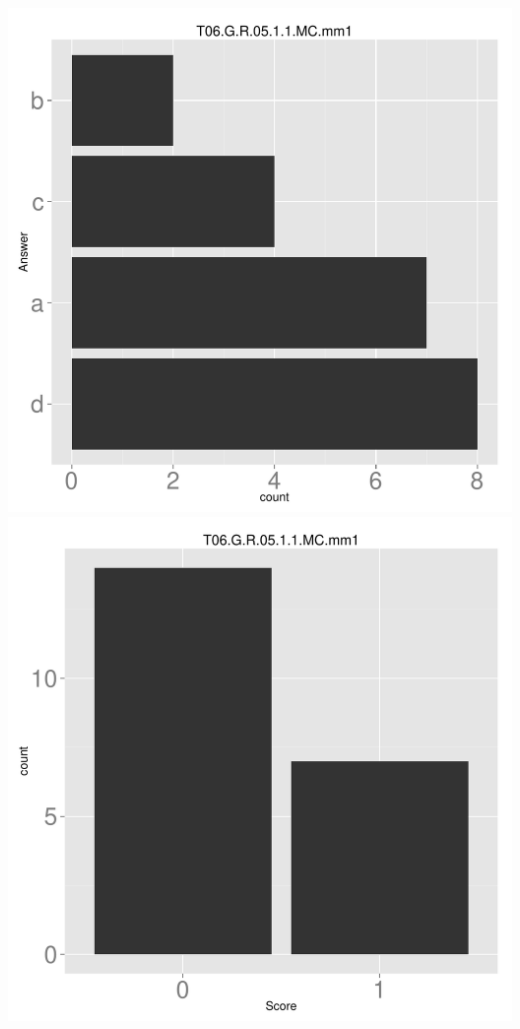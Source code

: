 \documentclass[12pt,nohyper]{tufte-handout}\usepackage[]{graphicx}\usepackage[]{color}
\begin{document}
\begin{center} \includegraphics[width=.45\linewidth]{Topic06_70_answer} \includegraphics[width=.45\linewidth]{Topic06_70_score} \end{center} 
\end{document}
